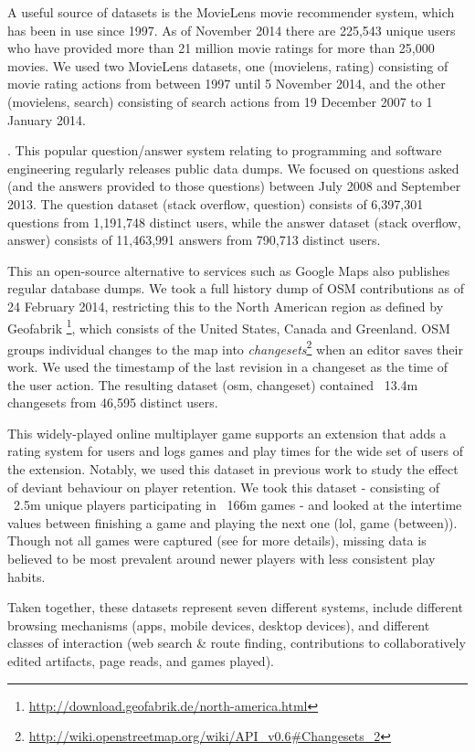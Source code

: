  A useful source of datasets is the MovieLens movie recommender system, which has been in use since 1997. As of November 2014 there are 225,543 unique users who have provided more than 21 million movie ratings for more than 25,000 movies. We used two MovieLens datasets, one (movielens, rating) consisting of movie rating actions from between 1997 until 5 November 2014, and the other (movielens, search) consisting of search actions from 19 December 2007 to 1 January 2014.

. This popular question/answer system relating to programming and software engineering regularly releases public data dumps. We focused on questions asked (and the answers provided to those questions) between July 2008 and September 2013. The question dataset (stack overflow, question) consists of 6,397,301 questions from 1,191,748 distinct users, while the answer dataset (stack overflow, answer) consists of 11,463,991 answers from 790,713 distinct users.

 This an open-source alternative to services such as Google Maps also publishes regular database dumps. We took a full history dump of OSM contributions as of 24 February 2014, restricting this to the North American region as defined by Geofabrik \footnote{\url{http://download.geofabrik.de/north-america.html}}, which consists of the United States, Canada and Greenland. OSM groups individual changes to the map into \textit{changesets}\footnote{\url{http://wiki.openstreetmap.org/wiki/API_v0.6#Changesets_2}} when an editor saves their work. We used the timestamp of the last revision in a changeset as the time of the user action. The resulting dataset (osm, changeset) contained ~13.4m changesets from 46,595 distinct users.

 This widely-played online multiplayer game supports an extension that adds a rating system for users and logs games and play times for the wide set of users of the extension.  Notably, we used this dataset in previous work to study the effect of deviant behaviour on player retention\cite{shores2014identification}. We took this dataset - consisting of ~2.5m unique players participating in ~166m games - and looked at the intertime values between finishing a game and playing the next one (lol, game (between)). Though not all games were captured (see \cite{shores2014identification} for more details), missing data is believed to be most prevalent around newer players with less consistent play habits.

Taken together, these datasets represent seven different systems, include different browsing mechanisms (apps, mobile devices, desktop devices), and different classes of interaction (web search \& route finding, contributions to collaboratively edited artifacts, page reads, and games played).
